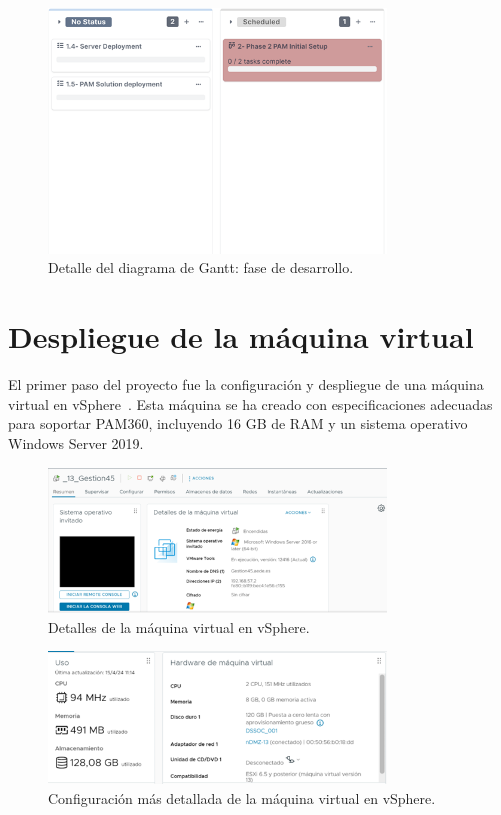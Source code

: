 \begin{figure}[H]
	\centering
	\includegraphics[width=0.8\textwidth]{./img/diagrama3.png}
	\caption{Detalle del diagrama de Gantt: fase de desarrollo.}
	\label{fig:diagrama_detalle2}
\end{figure}


\section{Despliegue de la máquina virtual}
El primer paso del proyecto fue la configuración y despliegue de una máquina virtual en vSphere~\cite{vsphere}. Esta máquina se ha creado con especificaciones adecuadas para soportar PAM360, incluyendo 16 GB de RAM y un sistema operativo Windows Server 2019.

\begin{figure}[H]
	\centering
	\includegraphics[width=0.8\textwidth]{./img/maquina_pam_vshpere.png}
	\caption{Detalles de la máquina virtual en vSphere.}
	\label{fig:maquina_pam_vshpere}
\end{figure}

\begin{figure}[H]
	\centering
	\includegraphics[width=0.8\textwidth]{./img/maquina_pam_detalle.png}
	\caption{Configuración  más detallada de la máquina virtual en vSphere.}
	\label{fig:maquina_pam_vshpere_detalle1}
\end{figure}

